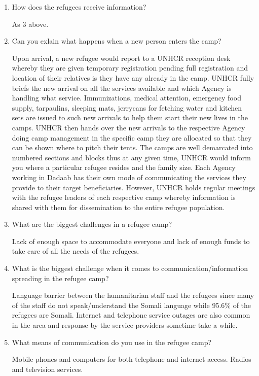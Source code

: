 \begin{enumerate}
\item How does the refugees receive information?

As 3 above.

\item Can you exlain what happens when a new person enters the camp?

Upon arrival, a new refugee would report to a UNHCR reception desk whereby they are given temporary registration pending full registration and location of their relatives is they have any already in the camp. UNHCR fully briefs the new arrival on all the services available and which Agency is handling what service. Immunizations, medical attention, emergency food supply, tarpaulins, sleeping mats, jerrycans for fetching water and kitchen sets are issued to such new arrivals to help them start their new lives in the camps. UNHCR then hands over the new arrivals to the respective Agency doing camp management in the specific camp they are allocated so that they can be shown where to pitch their tents. The camps are well demarcated into numbered sections and blocks thus at any given time, UNHCR would inform you where a particular refugee resides and the family size. Each Agency working in Dadaab has their own mode of communicating the services they provide to their target beneficiaries. However, UNHCR holds regular meetings with the refugee leaders of each respective camp whereby information is shared with them for dissemination to the entire refugee population.


\item What are the biggest challenges in a refugee camp?

Lack of enough space to accommodate everyone and lack of enough funds to take care of all the needs of the refugees.


\item What is the biggest challenge when it comes to communication/information spreading in the refugee camp?

Language barrier between the humanitarian staff and the refugees since many of the staff do not speak/understand the Somali language while 95.6\% of the refugees are Somali. Internet and telephone service outages are also common in the area and response by the service providers sometime take a while.


\item What means of communication do you use in the refugee camp?

Mobile phones and computers for both telephone and internet access. Radios and television services.



\end{enumerate}
